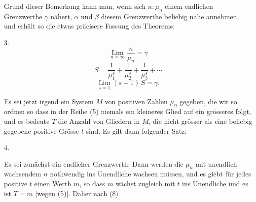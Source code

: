 Grund dieser Bemerkung kann man, wenn sich $n : \mu_n$ einem endlichen Grenzwerthe $\gamma$ nähert, $\alpha$ und $\beta$ diesem Grenzwerthe beliebig nahe annehmen, und erhält so die etwas präcisere Fassung des Theorems:

3. 
\[
\mathop{\mathrm{Lim}}\limits_{n=\infty} \frac{n}{\mu_n} = \gamma
\]
\[
S = \frac{1}{\mu_1^s} + \frac{1}{\mu_2^s} + \frac{1}{\mu_3^s} + \cdots
\]
\[
\mathop{\mathrm{Lim}}\limits_{s=1} (s-1)\,S = \gamma.
\]

Es sei jetzt irgend ein System $M$ von  positiven Zahlen $\mu_n$ gegeben, die wir so ordnen
so dass in der Reihe (5) niemals ein kleineres Glied auf ein grösseres folgt, und es bedeute $T$ die Anzahl von Gliedern in $M$, die nicht grösser als eine beliebig gegebene positive Grösse $t$ sind. Es gilt dann folgender Satz:

4. 

Es sei zunächst
ein endlicher Grenzwerth. Dann werden die $\mu_n$ mit unendlich wachsendem $n$ nothwendig ins Unendliche wachsen müssen, und es giebt für jedes positive $t$ einen Werth $m$, so dass
$m$ wächst zugleich mit $t$ ins Unendliche und es ist $T = m$ [wegen (5)]. Daher nach (8)
